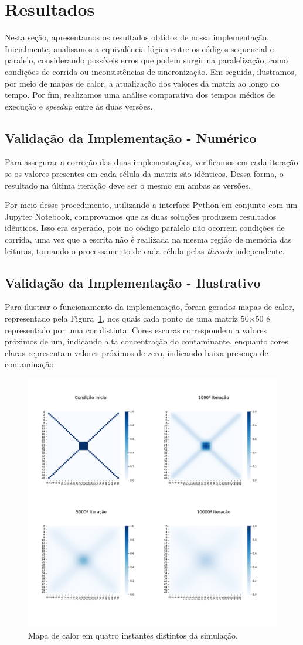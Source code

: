 \documentclass[12pt]{article}
\begin{document}
\section{Resultados}

Nesta seção, apresentamos os resultados obtidos de nossa implementação.
Inicialmente, analisamos a equivalência lógica entre os códigos sequencial e
paralelo, considerando possíveis erros que podem surgir na paralelização, como
condições de corrida ou inconsistências de sincronização. Em seguida,
ilustramos, por meio de mapas de calor, a atualização dos valores da matriz ao
longo do tempo. Por fim, realizamos uma análise comparativa dos tempos médios
de execução e \textit{speedup} entre as duas versões.

\subsection{Validação da Implementação - Numérico}

Para assegurar a correção das duas implementações, verificamos em cada iteração
se os valores presentes em cada célula da matriz são idênticos. Dessa forma, o
resultado na última iteração deve ser o mesmo em ambas as versões.

Por meio desse procedimento, utilizando a interface Python em conjunto com um
Jupyter Notebook, comprovamos que as duas soluções produzem resultados
idênticos. Isso era esperado, pois no código paralelo não ocorrem condições de
corrida, uma vez que a escrita não é realizada na mesma região de memória das
leituras, tornando o processamento de cada célula pelas \textit{threads}
independente.

\subsection{Validação da Implementação - Ilustrativo}

Para ilustrar o funcionamento da implementação, foram gerados mapas de calor,
representado pela Figura~\ref{fig:heatmap}, nos quais cada ponto de uma matriz
50$\times$50 é representado por uma cor distinta. Cores escuras correspondem a
valores próximos de um, indicando alta concentração do contaminante, enquanto
cores claras representam valores próximos de zero, indicando baixa presença de
contaminação.

\begin{figure}[ht]
  \centering
  \includegraphics[width=.5\textwidth]{figs/heatmap.png}
  \caption{Mapa de calor em quatro instantes distintos da simulação.}\label{fig:heatmap}
\end{figure}
\end{document}
